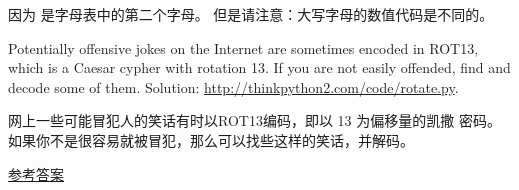 \begin{exercise}
因为  是字母表中的第二个字母。 但是请注意：大写字母的数值代码是不同的。

Potentially offensive jokes on the Internet are sometimes encoded in
ROT13, which is a Caesar cypher with rotation 13.  If you are not
easily offended, find and decode some of them.  Solution:
\url{http://thinkpython2.com/code/rotate.py}.

网上一些可能冒犯人的笑话有时以ROT13编码，即以 13 为偏移量的凯撒
密码。 如果你不是很容易就被冒犯，那么可以找些这样的笑话，并解码。

\href{http://thinkpython2.com/code/rotate.py}{参考答案}

\end{exercise}